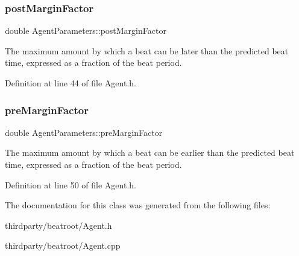 \subsubsection{\texorpdfstring{post\+Margin\+Factor}{postMarginFactor}}
{\footnotesize\ttfamily double Agent\+Parameters\+::post\+Margin\+Factor}

The maximum amount by which a beat can be later than the predicted beat time, expressed as a fraction of the beat period. 

Definition at line 44 of file Agent.\+h.

\mbox{\label{class_agent_parameters_a371f2e5668592f4985646456a42e9886}} 
\subsubsection{\texorpdfstring{pre\+Margin\+Factor}{preMarginFactor}}
{\footnotesize\ttfamily double Agent\+Parameters\+::pre\+Margin\+Factor}

The maximum amount by which a beat can be earlier than the predicted beat time, expressed as a fraction of the beat period. 

Definition at line 50 of file Agent.\+h.



The documentation for this class was generated from the following files\+:\begin{DoxyCompactItemize}
\item 
thirdparty/beatroot/Agent.\+h\item 
thirdparty/beatroot/Agent.\+cpp\end{DoxyCompactItemize}
